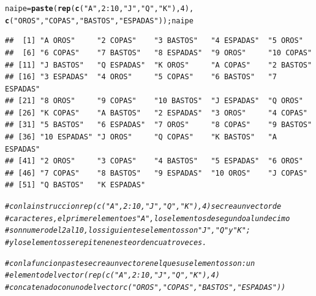 \documentclass[12pt,letterpaper]{article}\usepackage[]{graphicx}\usepackage[]{color}
\makeatletter
\newcommand{\hlnum}[1]{\textcolor[rgb]{0.686,0.059,0.569}{#1}}%
\newcommand{\hlstr}[1]{\textcolor[rgb]{0.192,0.494,0.8}{#1}}%
\newcommand{\hlcom}[1]{\textcolor[rgb]{0.678,0.584,0.686}{\textit{#1}}}%
\newcommand{\hlopt}[1]{\textcolor[rgb]{0,0,0}{#1}}%
\newcommand{\hlstd}[1]{\textcolor[rgb]{0.345,0.345,0.345}{#1}}%
\newcommand{\hlkwb}[1]{\textcolor[rgb]{0.69,0.353,0.396}{#1}}%
\newcommand{\hlkwd}[1]{\textcolor[rgb]{0.737,0.353,0.396}{\textbf{#1}}}%
\newenvironment{kframe}{%
 \def\at@end@of@kframe{}%
 \ifinner\ifhmode%
  \def\at@end@of@kframe{\end{minipage}}%
  \begin{minipage}{\columnwidth}%
 \fi\fi%
 \def\FrameCommand##1{\hskip\@totalleftmargin \hskip-\fboxsep
 \colorbox{shadecolor}{##1}\hskip-\fboxsep
     \hskip-\linewidth \hskip-\@totalleftmargin \hskip\columnwidth}%
 \MakeFramed {\advance\hsize-\width
   \@totalleftmargin\z@ \linewidth\hsize
   \@setminipage}}%
 {\par\unskip\endMakeFramed%
 \at@end@of@kframe}
\newenvironment{knitrout}{}{} %
\makeatother
\begin{document}
\begin{enumerate}
\begin{knitrout}
\begin{kframe}
\begin{alltt}
\hlstd{naipe} \hlkwb{=} \hlkwd{paste}\hlstd{(}\hlkwd{rep}\hlstd{(}\hlkwd{c}\hlstd{(}\hlstr{"A"}\hlstd{,} \hlnum{2}\hlopt{:}\hlnum{10}\hlstd{,} \hlstr{"J"}\hlstd{,} \hlstr{"Q"}\hlstd{,} \hlstr{"K"}\hlstd{),} \hlnum{4}\hlstd{),}
              \hlkwd{c}\hlstd{(}\hlstr{"OROS"}\hlstd{,}\hlstr{"COPAS"}\hlstd{,} \hlstr{"BASTOS"}\hlstd{,} \hlstr{"ESPADAS"}\hlstd{));naipe}
\end{alltt}
\begin{verbatim}
##  [1] "A OROS"     "2 COPAS"    "3 BASTOS"   "4 ESPADAS"  "5 OROS"    
##  [6] "6 COPAS"    "7 BASTOS"   "8 ESPADAS"  "9 OROS"     "10 COPAS"  
## [11] "J BASTOS"   "Q ESPADAS"  "K OROS"     "A COPAS"    "2 BASTOS"  
## [16] "3 ESPADAS"  "4 OROS"     "5 COPAS"    "6 BASTOS"   "7 ESPADAS" 
## [21] "8 OROS"     "9 COPAS"    "10 BASTOS"  "J ESPADAS"  "Q OROS"    
## [26] "K COPAS"    "A BASTOS"   "2 ESPADAS"  "3 OROS"     "4 COPAS"   
## [31] "5 BASTOS"   "6 ESPADAS"  "7 OROS"     "8 COPAS"    "9 BASTOS"  
## [36] "10 ESPADAS" "J OROS"     "Q COPAS"    "K BASTOS"   "A ESPADAS" 
## [41] "2 OROS"     "3 COPAS"    "4 BASTOS"   "5 ESPADAS"  "6 OROS"    
## [46] "7 COPAS"    "8 BASTOS"   "9 ESPADAS"  "10 OROS"    "J COPAS"   
## [51] "Q BASTOS"   "K ESPADAS"
\end{verbatim}
\end{kframe}
\end{knitrout}

\begin{knitrout}
\color{fgcolor}\begin{kframe}
\begin{alltt}
\hlcom{# con la instruccion rep(c("A", 2:10, "J", "Q", "K"), 4) se crea un vector de}
\hlcom{# caracteres, el primer elemento es "A", los elementos de segundo al undecimo }
\hlcom{# son numero del 2 al 10, los siguientes elementos son "J", "Q" y "K"; }
\hlcom{# y los elementos se repiten en este orden cuatro veces. }
\end{alltt}
\end{kframe}
\end{knitrout}

\begin{knitrout}
\color{fgcolor}\begin{kframe}
\begin{alltt}
\hlcom{#con la funcion paste se crea un vector en el que sus elementos son: un }
\hlcom{# elemento del vector (rep(c("A", 2:10, "J", "Q", "K"), 4)}
\hlcom{#concatenado con uno del vector c("OROS","COPAS", "BASTOS", "ESPADAS")) }
\end{alltt}
\end{kframe}
\end{knitrout}


\end{enumerate}
\end{document}
